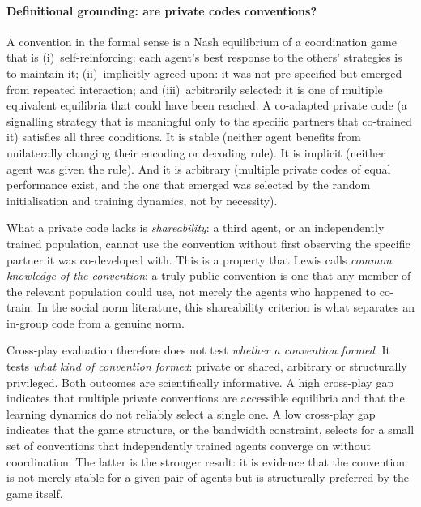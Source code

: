 \documentclass[a4paper,twoside,12pt]{report}
\begin{document}
    \paragraph{Definitional grounding: are private codes conventions?}
    A convention in the formal
    sense is a Nash equilibrium of a coordination game that is
    (i)~self-reinforcing: each agent's best response to the others'
    strategies is to maintain it; (ii)~implicitly agreed upon: it was
    not pre-specified but emerged from repeated interaction; and
    (iii)~arbitrarily selected: it is one of multiple equivalent equilibria
    that could have been reached. A co-adapted private code (a signalling strategy that is meaningful only to the specific partners
    that co-trained it)  satisfies all
    three conditions. It is stable (neither agent benefits from unilaterally
    changing their encoding or decoding rule). It is implicit (neither agent
    was given the rule). And it is arbitrary (multiple private codes of equal
    performance exist, and the one that emerged was selected by the random
    initialisation and training dynamics, not by necessity).
    
    What a private code lacks is \emph{shareability}: a third agent, or
    an independently trained population, cannot use the convention without
    first observing the specific partner it was co-developed with. This is
    a property that Lewis calls \emph{common knowledge of the convention}:
    a truly public convention is one that any member of the relevant
    population could use, not merely the agents who happened to co-train.
    In the social norm literature, this shareability criterion is what
    separates an in-group code from a genuine norm.
    
    Cross-play evaluation therefore does not test \emph{whether a convention
    formed}. It tests \emph{what kind of convention formed}: private or
    shared, arbitrary or structurally privileged. Both outcomes are
    scientifically informative. A high cross-play gap indicates that multiple
    private conventions are accessible equilibria and that the learning
    dynamics do not reliably select a single one. A low cross-play gap
    indicates that the game structure, or the bandwidth constraint, selects
    for a small set of conventions that independently trained agents
    converge on without coordination. The latter is the stronger result:
    it is evidence that the convention is not merely stable for a given
    pair of agents but is structurally preferred by the game itself.
    
\end{document}
